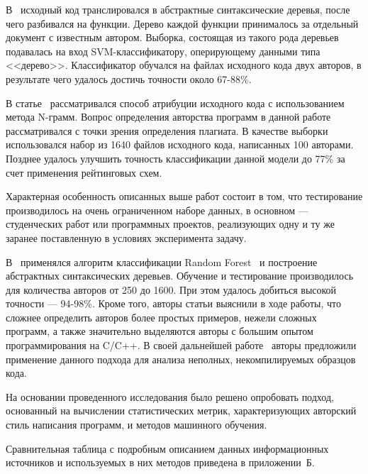 В~\cite{pellin} исходный код транслировался в абстрактные синтаксические деревья, 
после чего разбивался на функции. Дерево каждой функции принималось за отдельный документ с известным автором. 
Выборка, состоящая из такого рода деревьев подавалась на вход SVM-классификатору, 
оперирующему данными типа <<дерево>>. Классификатор обучался на файлах исходного кода двух авторов, в результате чего удалось достичь точности около 67-88\%.

В статье~\cite{burrows} рассматривался способ атрибуции исходного кода с использованием метода N-грамм. 
Вопрос определения авторства программ в данной работе рассматривался с точки зрения определения плагиата. 
В качестве выборки использовался набор из 1640 файлов исходного кода, написанных 100 авторами. Позднее 
удалось улучшить точность классификации данной модели до 77\% за счет применения рейтинговых схем.~\cite{burrows_big}

Характерная особенность описанных выше работ состоит в том, что тестирование производилось на очень 
ограниченном наборе данных, в основном --- студенческих работ или программных проектов, реализующих 
одну и ту же заранее поставленную в условиях эксперимента задачу.

В~\cite{caliskan} применялся алгоритм классификации Random Forest~\cite{random_forest} и построение 
абстрактных синтаксических деревьев. Обучение и тестирование производилось для 
количества авторов от 250 до 1600. При этом удалось добиться высокой точности --- 94-98\%. 
Кроме того, авторы статьи выяснили в ходе работы, что сложнее определить авторов более простых примеров, 
нежели сложных программ, а также значительно выделяются авторы с большим опытом программирования на C/C++. 
В своей дальнейшей работе~\cite{git_blame} авторы предложили применение данного подхода для анализа неполных, 
некомпилируемых образцов кода. 

На основании проведенного исследования было решено опробовать подход, основанный на вычислении 
статистических метрик, характеризующих авторский стиль написания программ, и методов машинного обучения. 

Сравнительная таблица с подробным описанием данных информационных источников и используемых в них методов 
приведена в приложении~Б.






